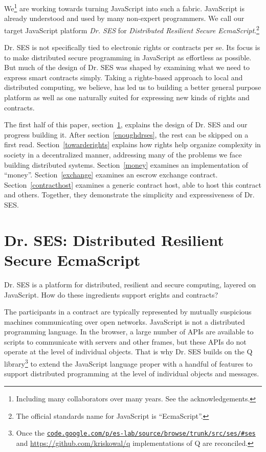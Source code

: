 \documentclass{llncs}
\newcommand{\myurl}[1]{{\href{http://#1}{\texttt{#1}}}}
\begin{document}
We\footnote{
%
Including many collaborators over many years. See the acknowledgements.
%
} are working towards turning JavaScript into such a fabric. JavaScript is already understood and used by many non-expert programmers. We call our target JavaScript platform \emph{Dr. SES} for \emph{Distributed Resilient Secure EcmaScript}.\footnote{
%
The official standards name for JavaScript is ``EcmaScript''.
%
} 

Dr. SES is not specifically tied to electronic rights or contracts per se. Its focus is to make distributed secure programming in JavaScript as effortless as possible. But much of the design of Dr. SES
%
%
was shaped by examining what we need to express smart contracts simply. Taking a rights-based approach to local and distributed computing, we believe, has led us to building a better general purpose platform as well as one naturally suited for expressing new kinds of rights and contracts.

The first half of this paper, section~\ref{drses}, explains the design of Dr. SES and our progress building it.  After section~\ref{enoughdrses}, the rest can be skipped on a first read. Section~\ref{towarderights} explains how rights help organize complexity in society in a decentralized manner, addressing many of the problems we face building distributed systems. Section~\ref{money} examines an implementation of ``money''. Section~\ref{exchange} examines an escrow exchange contract. Section~\ref{contracthost} examines a generic contract host, able to host this contract and others. Together, they demonstrate the simplicity and expressiveness of Dr. SES.



\section{Dr. SES: Distributed Resilient Secure EcmaScript}
\label{drses}

Dr. SES is a platform for distributed, resilient and secure computing, layered on JavaScript. How do these ingredients support erights and contracts?

The participants in a contract are typically represented by mutually suspicious machines communicating over open networks. JavaScript is not a distributed programming language. In the browser, a large number of APIs are available to scripts to communicate with servers and other frames, but these APIs do not operate at the level of individual objects. That is why Dr. SES builds on the Q library\footnote{
%
Once the \myurl{code.google.com/p/es-lab/source/browse/trunk/src/ses/\#ses} and \url{https://github.com/kriskowal/q} implementations of Q are reconciled.
%
} to extend the JavaScript language proper with a handful of features to support distributed programming at the level of individual objects and messages.
\end{document}
